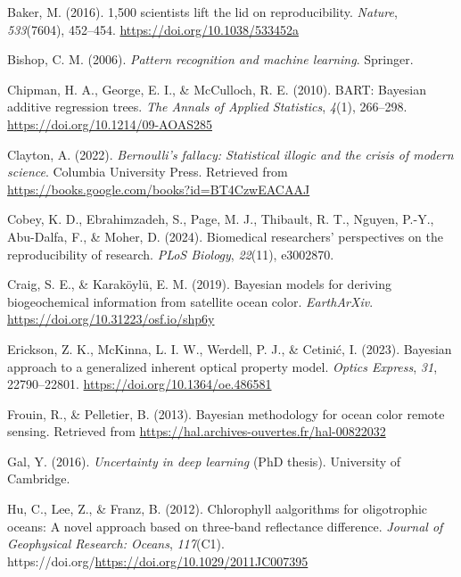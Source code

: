 \documentclass[
]{agujournal2019}
\newlength{\cslhangindent}
\newenvironment{CSLReferences}[2] %
 {\begin{list}{}{%
  \setlength{\itemindent}{0pt}
  \setlength{\leftmargin}{0pt}
  \setlength{\parsep}{0pt}
  \ifodd #1
   \setlength{\leftmargin}{\cslhangindent}
   \setlength{\itemindent}{-1\cslhangindent}
  \fi
  \setlength{\itemsep}{#2\baselineskip}}}
 {\end{list}}
\begin{document}
\label{refs}
\begin{CSLReferences}{1}{0}
\vspace{1em}

Baker, M. (2016). 1,500 scientists lift the lid on reproducibility.
\emph{Nature}, \emph{533}(7604), 452--454.
\url{https://doi.org/10.1038/533452a}

Bishop, C. M. (2006). \emph{Pattern recognition and machine learning}.
Springer.

Chipman, H. A., George, E. I., \& McCulloch, R. E. (2010). BART:
Bayesian additive regression trees. \emph{The Annals of Applied
Statistics}, \emph{4}(1), 266--298.
\url{https://doi.org/10.1214/09-AOAS285}

Clayton, A. (2022). \emph{Bernoulli's fallacy: Statistical illogic and
the crisis of modern science}. Columbia University Press. Retrieved from
\url{https://books.google.com/books?id=BT4CzwEACAAJ}

Cobey, K. D., Ebrahimzadeh, S., Page, M. J., Thibault, R. T., Nguyen,
P.-Y., Abu-Dalfa, F., \& Moher, D. (2024). Biomedical researchers'
perspectives on the reproducibility of research. \emph{PLoS Biology},
\emph{22}(11), e3002870.

Craig, S. E., \& Karaköylü, E. M. (2019). Bayesian models for deriving
biogeochemical information from satellite ocean color.
\emph{EarthArXiv}. \url{https://doi.org/10.31223/osf.io/shp6y}

Erickson, Z. K., McKinna, L. I. W., Werdell, P. J., \& Cetinić, I.
(2023). Bayesian approach to a generalized inherent optical property
model. \emph{Optics Express}, \emph{31}, 22790--22801.
\url{https://doi.org/10.1364/oe.486581}

Frouin, R., \& Pelletier, B. (2013). Bayesian methodology for ocean
color remote sensing. Retrieved from
\url{https://hal.archives-ouvertes.fr/hal-00822032}

Gal, Y. (2016). \emph{Uncertainty in deep learning} (PhD thesis).
University of Cambridge.

Hu, C., Lee, Z., \& Franz, B. (2012). Chlorophyll aalgorithms for
oligotrophic oceans: A novel approach based on three-band reflectance
difference. \emph{Journal of Geophysical Research: Oceans},
\emph{117}(C1).
https://doi.org/\url{https://doi.org/10.1029/2011JC007395}


\end{CSLReferences}
\end{document}
